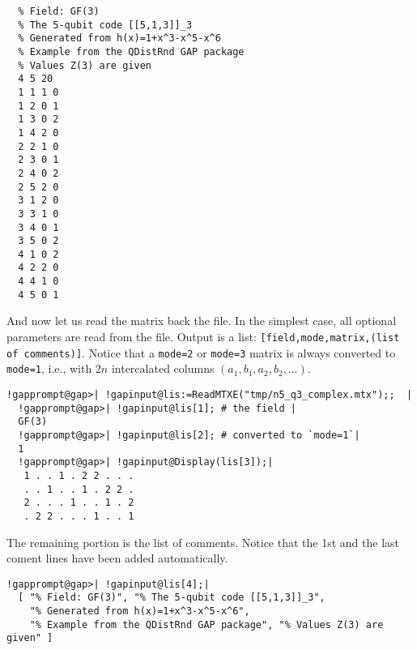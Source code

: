 \documentclass[a4paper,11pt]{report}
\begin{document}
{{\begin{Verbatim}[commandchars=!@|,fontsize=\small,frame=single,label=Example]
  %%MatrixMarket matrix coordinate complex general
  % Field: GF(3)
  % The 5-qubit code [[5,1,3]]_3
  % Generated from h(x)=1+x^3-x^5-x^6
  % Example from the QDistRnd GAP package
  % Values Z(3) are given
  4 5 20
  1 1 1 0
  1 2 0 1
  1 3 0 2
  1 4 2 0
  2 2 1 0
  2 3 0 1
  2 4 0 2
  2 5 2 0
  3 1 2 0
  3 3 1 0
  3 4 0 1
  3 5 0 2
  4 1 0 2
  4 2 2 0
  4 4 1 0
  4 5 0 1
\end{Verbatim}
 And now let us read the matrix back the file. In the simplest case, all
optional parameters are read from the file. Output is a list: \texttt{[field,mode,matrix,(list of comments)]}. Notice that a \texttt{mode=2} or \texttt{mode=3} matrix is always converted to \texttt{mode=1}, i.e., with $2n$ intercalated columns $(a_1,b_1,a_2,b_2,\ldots)$. 
\begin{Verbatim}[commandchars=!@|,fontsize=\small,frame=single,label=Example]
  !gapprompt@gap>| !gapinput@lis:=ReadMTXE("tmp/n5_q3_complex.mtx");;  |
  !gapprompt@gap>| !gapinput@lis[1]; # the field |
  GF(3)
  !gapprompt@gap>| !gapinput@lis[2]; # converted to `mode=1`|
  1
  !gapprompt@gap>| !gapinput@Display(lis[3]);|
   1 . . 1 . 2 2 . . .
   . . 1 . . 1 . 2 2 .
   2 . . . 1 . . 1 . 2
   . 2 2 . . . 1 . . 1
\end{Verbatim}
 The remaining portion is the list of comments. Notice that the 1st and the
last coment lines have been added automatically. 
\begin{Verbatim}[commandchars=!@|,fontsize=\small,frame=single,label=Example]
  !gapprompt@gap>| !gapinput@lis[4];|
  [ "% Field: GF(3)", "% The 5-qubit code [[5,1,3]]_3",
    "% Generated from h(x)=1+x^3-x^5-x^6",
    "% Example from the QDistRnd GAP package", "% Values Z(3) are given" ]
\end{Verbatim}
 }

 
}
\end{document}
